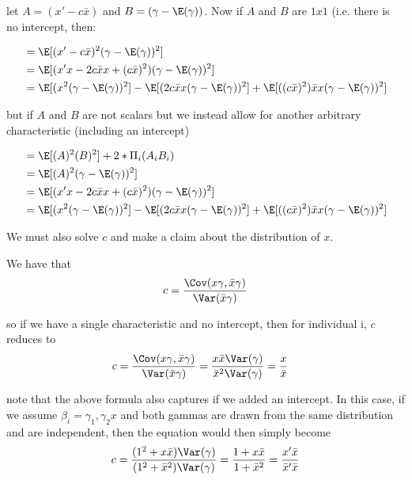 let $A = ( x' - c \bar{x})$ and $B = (\gamma - \E(\gamma))$. Now if $A$ and $B$ are $1x1$ (i.e. there is no intercept, then:

\begin{align*}
									 &= \E[ ( x' - c \bar{x})^2 (\gamma - \E(\gamma))^2] \\
									 &= \E[ ( x'x - 2 c \bar{x}x + (c \bar{x})^2) (\gamma - \E(\gamma))^2] \\
									 &= \E[ ( x^2 (\gamma - \E(\gamma))^2]  - \E[ ( 2 c \bar{x}x (\gamma - \E(\gamma))^2] + \E[ ( (c \bar{x})^2) \bar{x}x (\gamma - \E(\gamma))^2] \\
\end{align*} 

but if $A$ and $B$ are not scalars but we instead allow for another arbitrary characteristic (including an intercept)

\begin{align*}
									 &= \E[ (A)^2 (B)^2] + 2*\Pi_i( A_i B_i) \\
									 &= \E[ (A)^2 (\gamma - \E(\gamma))^2] \\
									 &= \E[ ( x'x - 2 c \bar{x}x + (c \bar{x})^2) (\gamma - \E(\gamma))^2] \\
									 &= \E[ ( x^2 (\gamma - \E(\gamma))^2]  - \E[ ( 2 c \bar{x}x (\gamma - \E(\gamma))^2] + \E[ ( (c \bar{x})^2) \bar{x}x (\gamma - \E(\gamma))^2] \\
\end{align*} 

We must also solve $c$ and make a claim about the distribution of $x$.

We have that
\begin{align*}
	c = \frac{\Cov (x \gamma, \bar{x} \gamma)}{ \Var( \bar{x} \gamma )}
\end{align*} 

so if we have a single characteristic and no intercept, then for individual i, $c$ reduces to
\begin{align*}
	c &= \frac{\Cov (x \gamma, \bar{x} \gamma)}{ \Var( \bar{x} \gamma )} = \frac{x \bar{x} \Var(\gamma)}{\bar{x}^2 \Var(\gamma)} = \frac{x}{\bar{x}}
\end{align*} 


note that the above formula also captures if we added an intercept. In this case, if we assume $\beta_i = \gamma_1, \gamma_2 x$ and both gammas are drawn from the same distribution and are independent, then the equation would then simply become
\begin{align*}
	c = \frac{(1^2 + x \bar{x})\Var(\gamma)}{(1^2 + \bar{x}^2)\Var(\gamma)} = \frac{1 + x \bar{x}}{1 + \bar{x}^2} = \frac{x' \bar{x}}{\bar{x}' \bar{x}}
\end{align*} 

